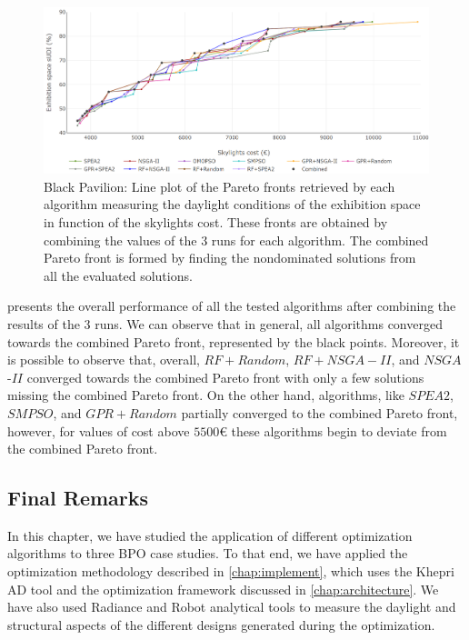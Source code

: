 \begin{figure}[htbp]
	\centering
	\includegraphics[width=\textwidth]{Images/Evaluation/BlackPavilion/All_Algorithms_all_runs-2019-04-16.png}
	\caption[Black Pavilion: Pareto front plot]{Black Pavilion: Line plot of the Pareto fronts retrieved by each algorithm measuring the daylight conditions of the exhibition space in function of the skylights cost. These fronts are obtained by combining the values of the $3$ runs for each algorithm. The combined Pareto front is formed by finding the nondominated solutions from all the evaluated solutions.}
	\label{fig:blackpavilionallruns}
\end{figure}

 presents the overall performance of all the tested algorithms after combining the results of the $3$ runs. We can observe that in general, all algorithms converged towards the combined Pareto front, represented by the black points. Moreover, it is possible to observe that, overall, $RF+Random$, $RF+NSGA-II$, and $NSGA$-$II$ converged towards the combined Pareto front with only a few solutions missing the combined Pareto front. On the other hand, algorithms, like $SPEA2$, $SMPSO$, and $GPR+Random$ partially converged to the combined Pareto front, however, for values of cost above $5500$€ these algorithms begin to deviate from the combined Pareto front.

\subsection{Final Remarks}

In this chapter, we have studied the application of different optimization algorithms to three \ac{BPO} case studies. To that end, we have applied the optimization methodology described in \cref{chap:implement}, which uses the Khepri \ac{AD} tool and the optimization framework discussed in \cref{chap:architecture}. We have also used Radiance and Robot analytical tools to measure the daylight and structural aspects of the different designs generated during the optimization.

